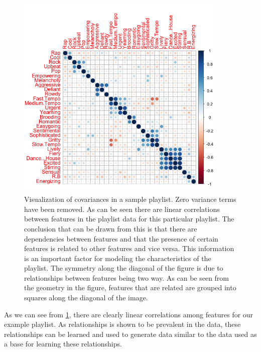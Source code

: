 \documentclass[a4paper,11pt]{kth-mag}
\begin{document}
\begin{figure}
\centering
\includegraphics[width=0.9\textwidth]{images/0removedPlistFeaturePlot.png}
\caption{Visualization of covariances in a sample playlist. Zero variance terms have been removed. As can be seen there are linear correlations between features in the playlist data for this particular playlist. The conclusion that can be drawn from this is that there are dependencies between features and that the presence of certain features is related to other features and vice versa. This information is an important factor for modeling the characteristics of the playlist. The symmetry along the diagonal of the figure is due to relationships between features being two way. As can be seen from the geometry in the figure, features that are related are grouped into squares along the diagonal of the image.}

\label{plistCorrs}

\end{figure}


As we can see from \ref{plistCorrs}, there are clearly linear correlations among features for our example playlist. As relationships is shown to be prevalent in the data, these relationships can be learned and used to generate data similar to the data used as a base for learning these relationships.
\end{document}
